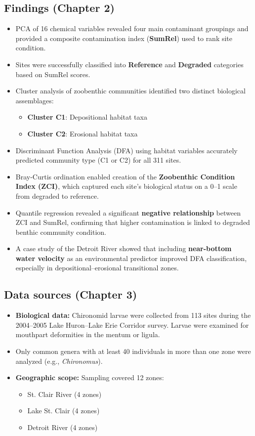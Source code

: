 \subsection{Findings (Chapter 2)}
\begin{itemize}
    \item PCA of 16 chemical variables revealed four main contaminant groupings and provided a composite contamination index (\textbf{SumRel}) used to rank site condition.
    \item Sites were successfully classified into \textbf{Reference} and \textbf{Degraded} categories based on SumRel scores.
    \item Cluster analysis of zoobenthic communities identified two distinct biological assemblages:
    \begin{itemize}
      \item \textbf{Cluster C1}: Depositional habitat taxa
      \item \textbf{Cluster C2}: Erosional habitat taxa
    \end{itemize}
    \item Discriminant Function Analysis (DFA) using habitat variables accurately predicted community type (C1 or C2) for all 311 sites.
    \item Bray-Curtis ordination enabled creation of the \textbf{Zoobenthic Condition Index (ZCI)}, which captured each site's biological status on a 0–1 scale from degraded to reference.
    \item Quantile regression revealed a significant \textbf{negative relationship} between ZCI and SumRel, confirming that higher contamination is linked to degraded benthic community condition.
    \item A case study of the Detroit River showed that including \textbf{near-bottom water velocity} as an environmental predictor improved DFA classification, especially in depositional–erosional transitional zones.
  \end{itemize}


\subsection{Data sources (Chapter 3)}
\begin{itemize}
  \item \textbf{Biological data:} Chironomid larvae were collected from 113 sites during the 2004–2005 Lake Huron–Lake Erie Corridor survey. Larvae were examined for mouthpart deformities in the mentum or ligula.
  \item Only common genera with at least 40 individuals in more than one zone were analyzed (e.g., \textit{Chironomus}).
  \item \textbf{Geographic scope:} Sampling covered 12 zones:
  \begin{itemize}
    \item St. Clair River (4 zones)
    \item Lake St. Clair (4 zones)
    \item Detroit River (4 zones)
  \end{itemize}
\end{itemize}

